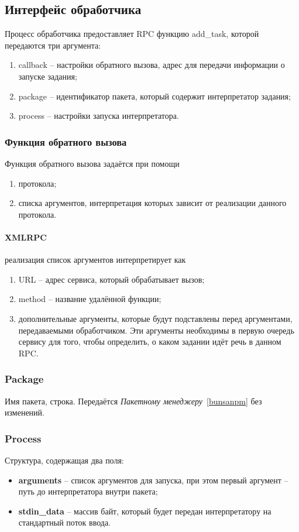 \subsection{Интерфейс обработчика}
Процесс обработчика предоставляет RPC функцию add\_task,
которой передаются три аргумента:
\begin{enumerate}
    \item callback -- настройки обратного вызова,
        адрес для передачи информации о запуске задания;
    \item package -- идентификатор пакета,
        который содержит интерпретатор задания;
    \item process -- настройки запуска интерпретатора.
\end{enumerate}

\subsubsection{Функция обратного вызова}
Функция обратного вызова задаётся при помощи
\begin{enumerate}
    \item протокола;
    \item списка аргументов, интерпретация которых зависит
        от реализации данного протокола.
\end{enumerate}

\paragraph{XMLRPC} реализация список аргументов интерпретирует как
\begin{enumerate}
    \item URL -- адрес сервиса, который обрабатывает вызов;
    \item method -- название удалённой функции;
    \item дополнительные аргументы, которые будут подставлены
        перед аргументами, передаваемыми обработчиком.
        Эти аргументы необходимы в первую очередь
        сервису для того, чтобы определить,
        о каком задании идёт речь в данном RPC.
\end{enumerate}

\subsubsection{Package}
Имя пакета, строка. Передаётся \textit{Пакетному менеджеру}~\ref{bunsanpm} без изменений.

\subsubsection{Process}
Структура, содержащая два поля:
\begin{itemize}
    \item \textbf{arguments} -- список аргументов для запуска,
        при этом первый аргумент -- путь до интерпретатора
        внутри пакета;
    \item \textbf{stdin\_data} -- массив байт, который будет передан
        интерпретатору на стандартный поток ввода.
\end{itemize}
